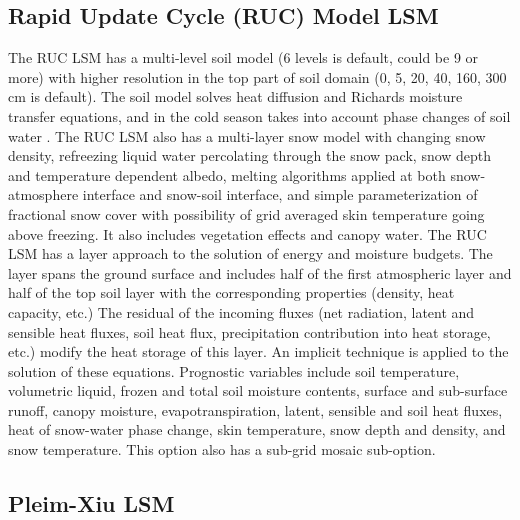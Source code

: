\subsection{Rapid Update Cycle (RUC) Model LSM}

The RUC LSM has a multi-level soil model (6 levels is default, could be 9 or more) with higher resolution in the top part of soil domain 
(0, 5, 20, 40, 160, 300 cm is default). The soil model solves heat diffusion and Richards moisture transfer equations, and in the cold season
takes into account phase changes of soil water \citep{smirnova97, smirnova00}. 
The RUC LSM also has a multi-layer snow model with changing snow density, refreezing liquid water 
percolating through the snow pack, snow depth and temperature dependent albedo, melting algorithms applied at both 
snow-atmosphere interface and snow-soil interface, and simple parameterization of fractional snow cover with possibility of 
grid averaged skin temperature going above freezing. It also includes vegetation effects and canopy water.
The RUC LSM has a layer approach to the solution of energy and moisture budgets. 
The layer spans the ground surface and includes half of the first atmospheric layer and half of the top soil layer with the 
corresponding properties (density, heat capacity, etc.) The residual of the incoming fluxes (net radiation, latent and sensible heat fluxes, 
soil heat flux, precipitation contribution into heat storage, etc.) modify the heat storage of this layer. 
An implicit technique is applied to the solution of these equations.
Prognostic variables include soil temperature, volumetric liquid, frozen and total soil moisture contents, 
surface and sub-surface runoff, canopy moisture, evapotranspiration, latent, sensible and soil heat fluxes, 
heat of snow-water phase change, skin temperature, snow depth and density, and snow temperature. 
This option also has a sub-grid mosaic sub-option.

\subsection{Pleim-Xiu LSM}


